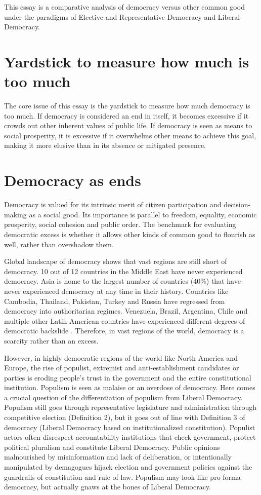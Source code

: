 \documentclass{scrartcl}
\theoremstyle{definition}
\begin{document}
This essay is a comparative analysis of democracy versus other common good under the paradigms of Elective and Representative Democracy and Liberal Democracy. 

\section{Yardstick to measure how much is too much}

The core issue of this essay is the yardstick to measure how much democracy is too much. If democracy is considered an end in itself, it becomes excessive if it crowds out other inherent values of public life. If democracy is seen as means to social prosperity, it is excessive if it overwhelms other means to achieve this goal, making it more elusive than in its absence or mitigated presence. 

\section{Democracy as ends}

Democracy is valued for its intrinsic merit of citizen participation and decision-making as a social good. Its importance is parallel to freedom, equality, economic prosperity, social cohesion and public order. The benchmark for evaluating democratic excess is whether it allows other kinds of common good to flourish as well, rather than overshadow them. 

Global landscape of democracy shows that vast regions are still short of democracy. 10 out of 12 countries in the Middle East have never experienced democracy. Asia is home to the largest number of countries (40\%) that have never experienced democracy at any time in their history. Countries like Cambodia, Thailand, Pakistan, Turkey and Russia have regressed from democracy into authoritarian regimes. Venezuela, Brazil, Argentina, Chile and multiple other Latin American countries have experienced different degrees of democratic backslide \autocite{IDEA}. Therefore, in vast regions of the world, democracy is a scarcity rather than an excess. 

However, in highly democratic regions of the world like North America and Europe, the rise of populist, extremist and anti-establishment candidates or parties is eroding people's trust in the government and the entire constitutional institution. Populism is seen as malaise or an overdose of democracy. Here comes a crucial question of the differentiation of populism from Liberal Democracy. Populism still goes through representative legislature and administration through competitive election (Definition 2), but it goes out of line with Definition 3 of democracy (Liberal Democracy based on institutionalized constitution). Populist actors often disrespect accountability institutions that check government, protect political pluralism and constitute Liberal Democracy. Public opinions malnourished by misinformation and lack of deliberation, or intentionally manipulated by demagogues hijack election and government policies against the guardrails of constitution and rule of law. Populism may look like pro forma democracy, but actually gnaws at the bones of Liberal Democracy. 
\end{document}

